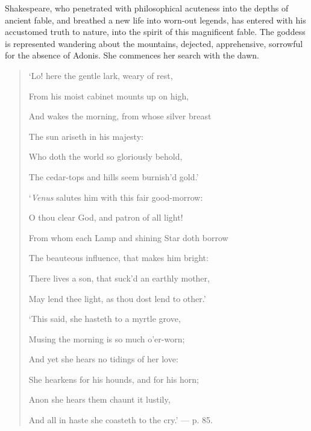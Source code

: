 \documentclass[a4paper, 11pt, oneside, polutonikogreek, english]{article}
\begin{document}
Shakespeare, who penetrated with philosophical acuteness into the depths of ancient fable, and breathed a new life into worn-out legends, has entered with his accustomed truth to nature, into the spirit of this magnificent fable. The goddess is represented wandering about the mountains, dejected, apprehensive, sorrowful for the absence of Adonis. She commences her search with the dawn.
\begin{quotation}\footnotesize
`Lo! here the gentle lark, weary of rest,

From his moist cabinet mounts up on high,

And wakes the morning, from whose silver breast

The sun ariseth in his majesty:

\hspace*{15mm}Who doth the world so gloriously behold,

\hspace*{15mm}The cedar-tops and hills seem burnish'd gold.'

\bigskip

`\emph{Venus} salutes him with this fair good-morrow:

O thou clear God, and patron of all light!

From whom each Lamp and shining Star doth borrow

The beauteous influence, that makes him bright:

\hspace*{15mm}There lives a son, that suck'd an earthly mother,

\hspace*{15mm}May lend thee light, as thou dost lend to other.'

\bigskip

`This said, she hasteth to a myrtle grove,

Musing the morning is so much o'er-worn;

And yet she hears no tidings of her love:

She hearkens for his hounds, and for his horn;

\hspace*{15mm}Anon she hears them chaunt it lustily,

\hspace*{15mm}And all in haste she coasteth to the cry.' --- p. 85.
\end{quotation}
\end{document}
